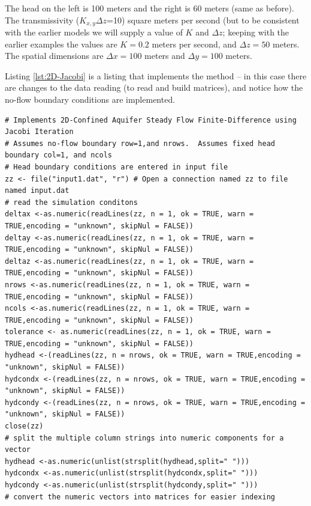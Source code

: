 The head on the left is 100 meters and the right is 60 meters (same as before).
The transmissivity ($K_{x,y} \Delta z$=10) square meters per second (but to be consistent with the earlier models we will supply a value of $K$ and $\Delta z$; keeping with the earlier examples the values are $K=0.2$ meters per second, and $\Delta z=50$ meters.
The spatial dimensions are $\Delta x = 100$ meters and $\Delta y = 100$ meters.

Listing \ref{lst:2D-Jacobi} is a listing that implements the method -- in this case there are changes to the data reading (to read and build matrices), and notice how the no-flow boundary conditions are implemented.   
\begin{lstlisting}[caption= R code demonstrating an Aquifer Flow Simulator for 2D Steady Flow.  This code fragment implements the Jacobi iteration.  A subsequent listing shows the contour plot syntax.  In the example the two fragments are joined and run as a single source file \\ , label=lst:2D-Jacobi]
# Implements 2D-Confined Aquifer Steady Flow Finite-Difference using Jacobi Iteration
# Assumes no-flow boundary row=1,and nrows.  Assumes fixed head boundary col=1, and ncols
# Head boundary conditions are entered in input file
zz <- file("input1.dat", "r") # Open a connection named zz to file named input.dat
# read the simulation conditons
deltax <-as.numeric(readLines(zz, n = 1, ok = TRUE, warn = TRUE,encoding = "unknown", skipNul = FALSE))
deltay <-as.numeric(readLines(zz, n = 1, ok = TRUE, warn = TRUE,encoding = "unknown", skipNul = FALSE))
deltaz <-as.numeric(readLines(zz, n = 1, ok = TRUE, warn = TRUE,encoding = "unknown", skipNul = FALSE))
nrows <-as.numeric(readLines(zz, n = 1, ok = TRUE, warn = TRUE,encoding = "unknown", skipNul = FALSE))
ncols <-as.numeric(readLines(zz, n = 1, ok = TRUE, warn = TRUE,encoding = "unknown", skipNul = FALSE))
tolerance <- as.numeric(readLines(zz, n = 1, ok = TRUE, warn = TRUE,encoding = "unknown", skipNul = FALSE))
hydhead <-(readLines(zz, n = nrows, ok = TRUE, warn = TRUE,encoding = "unknown", skipNul = FALSE))
hydcondx <-(readLines(zz, n = nrows, ok = TRUE, warn = TRUE,encoding = "unknown", skipNul = FALSE))
hydcondy <-(readLines(zz, n = nrows, ok = TRUE, warn = TRUE,encoding = "unknown", skipNul = FALSE))
close(zz)
# split the multiple column strings into numeric components for a vector
hydhead <-as.numeric(unlist(strsplit(hydhead,split=" ")))
hydcondx <-as.numeric(unlist(strsplit(hydcondx,split=" ")))
hydcondy <-as.numeric(unlist(strsplit(hydcondy,split=" ")))
# convert the numeric vectors into matrices for easier indexing

\end{lstlisting}

